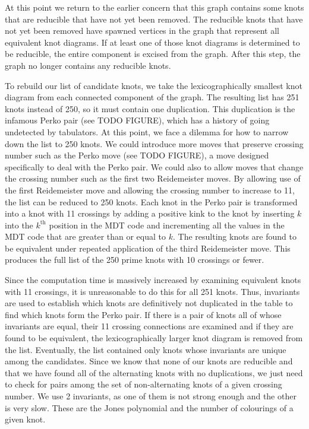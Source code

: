 \begin{paper}
At this point we return to the earlier concern that this graph contains some
knots that are reducible that have not yet been removed.
The reducible knots that have not yet been removed have spawned vertices in the
graph that represent all equivalent knot diagrams.
If at least one of those knot diagrams is determined to be reducible, the entire
component is excised from the graph.
After this step, the graph no longer contains any reducible knots.

To rebuild our list of candidate knots, we take the lexicographically smallest
knot diagram from each connected component of the graph.
The resulting list has 251 knots instead of 250, so it must contain one
duplication.
This duplication is the infamous Perko pair (see TODO FIGURE), which has a
history of going undetected by tabulators.
At this point, we face a dilemma for how to narrow down the list to 250 knots.
We could introduce more moves that preserve crossing number such as the Perko
move (see TODO FIGURE), a move designed specifically to deal with the Perko
pair.
We could also to allow moves that change the crossing number such as the first
two Reidemeister moves.
By allowing use of the first Reidemeister move and allowing the crossing number
to increase to 11, the list can be reduced to 250 knots.
Each knot in the Perko pair is transformed into a knot with 11 crossings by
adding a positive kink to the knot by inserting $k$ into the $k^\text{th}$
position in the MDT code and incrementing all the values in the MDT code that
are greater than or equal to $k$.
The resulting knots are found to be equivalent under repeated application of the
third Reidemeister move.
This produces the full list of the 250 prime knots with 10 crossings or fewer.


Since the computation time is massively increased by examining equivalent knots
with 11 crossings, it is unreasonable to do this for all 251 knots.
Thus, invariants are used to establish which knots are definitively not
duplicated in the table to find which knots form the Perko pair.
If there is a pair of knots all of whose invariants are equal, their 11 crossing
connections are examined and if they are found to be equivalent, the
lexicographically larger knot diagram is removed from the list.
Eventually, the list contained only knots whose invariants are unique among the
candidates.
Since we know that none of our knots are reducible and that we have found all of
the alternating knots with no duplications, we just need to check for pairs
among the set of non-alternating knots of a given crossing number.
We use 2 invariants, as one of them is not strong enough and the other is very
slow.
These are the Jones polynomial and the number of colourings of a given knot.


\end{paper}
